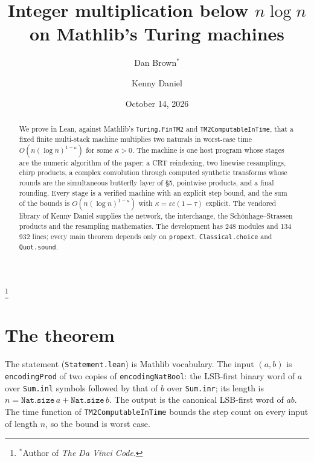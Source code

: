 \documentclass[11pt]{amsart}
\theoremstyle{remark}
\begin{document}
\title[A fast Mathlib multiplier]{Integer multiplication below $n\log n$\\ on Mathlib's Turing machines}

\author{Dan Brown$^*$}
\thanks{$^*$Author of \emph{The Da Vinci Code}.}

\author{Kenny Daniel}

\date{October 14, 2026}

\begin{abstract}
We prove in Lean, against Mathlib's \texttt{Turing.FinTM2} and \texttt{TM2ComputableInTime},
that a fixed finite multi-stack machine multiplies two naturals in worst-case time
$O(n(\log n)^{1-\kappa})$ for some $\kappa>0$. The machine is one host program whose stages are
the numeric algorithm of the paper: a CRT reindexing, two linewise resamplings, chirp
products, a complex convolution through computed synthetic transforms whose rounds are the
simultaneous butterfly layer of \S5, pointwise products, and a final rounding. Every stage is
a verified machine with an explicit step bound, and the sum of the bounds is
$O(n(\log n)^{1-\kappa})$ with $\kappa=\varepsilon c(1-\tau)$ explicit. The vendored library
of Kenny Daniel supplies the network, the interchange, the Schönhage--Strassen products and
the resampling mathematics. The development has 248 modules and 134\,932 lines; every main
theorem depends only on \texttt{propext}, \texttt{Classical.choice} and \texttt{Quot.sound}.
\end{abstract}

\maketitle

\section{The theorem}

The statement (\texttt{Statement.lean}) is Mathlib vocabulary. The input $(a,b)$ is
\texttt{encodingProd} of two copies of \texttt{encodingNatBool}: the LSB-first binary word of
$a$ over \texttt{Sum.inl} symbols followed by that of $b$ over \texttt{Sum.inr}; its length is
$n=\texttt{Nat.size}\,a+\texttt{Nat.size}\,b$. The output is the canonical LSB-first word of
$ab$. The time function of \texttt{TM2ComputableInTime} bounds the step count on every input
of length $n$, so the bound is worst case.
\end{document}
